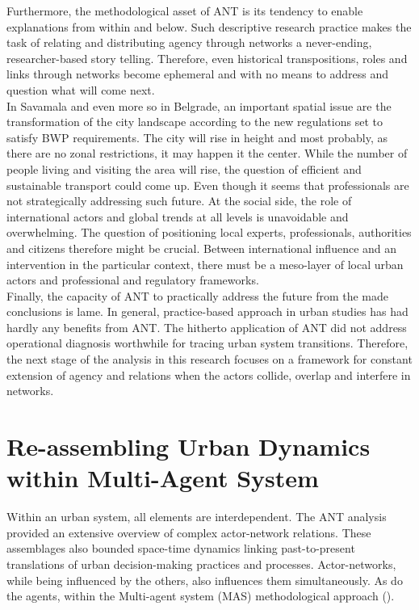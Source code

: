 \documentclass[11pt]{report}
\begin{document}
Furthermore, the methodological asset of ANT is its tendency to enable explanations from within and below.
Such descriptive research practice makes the task of relating and distributing agency through networks a never-ending, researcher-based story telling.
Therefore, even historical transpositions, roles and links through networks become ephemeral and with no means to address and question what will come next.
\\
 
In Savamala and even more so in Belgrade, an important spatial issue are the transformation of the city landscape according to the new regulations set to satisfy BWP requirements.
The city will rise in height and most probably, as there are no zonal restrictions, it may happen it the center. While the number of people living and visiting the area will rise, the question of efficient and sustainable transport could come up. 
Even though it seems that professionals are not strategically addressing such future.
At the social side, the role of international actors and global trends at all levels is unavoidable and overwhelming. 
The question of positioning local experts, professionals, authorities and citizens therefore might be crucial.
Between international influence and an intervention in the particular context, there must be a meso-layer of local urban actors and professional and regulatory frameworks.
\\

Finally, the capacity of ANT to practically address the future from the made conclusions is lame.
In general, practice-based approach in urban studies has had hardly any benefits from ANT.
The hitherto application of ANT did not address  operational diagnosis worthwhile for tracing urban system transitions.
Therefore, the next stage of the analysis in this research focuses on a framework for constant extension of agency and relations when the actors collide, overlap and interfere in networks. 

\chapter{Re-assembling Urban Dynamics within Multi-Agent System}


Within an urban system, all elements are interdependent.
The ANT analysis provided an extensive overview of complex  actor-network relations. These assemblages also bounded space-time dynamics linking past-to-present translations of urban decision-making practices and processes. Actor-networks, while being influenced by the others, also influences them simultaneously. As do the agents, within the Multi-agent system (MAS) methodological approach (\href{Bousquet}{\citealt{bousquet_multi-agent_2004}}).
\\
\end{document}
